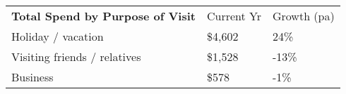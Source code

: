 \begin{tabular}[t]{p{5.1cm}>{\hfill}p{1.1cm}>{\hfill}p{1.3cm}}
 \textbf{Total Spend by Purpose of Visit} & Current Yr & Growth (pa) \\ 
 Holiday / vacation & \$4,602 & 24\% \\ 
  Visiting friends / relatives & \$1,528 & -13\% \\ 
  Business & \$578   & -1\% \\ 
  \end{tabular}
